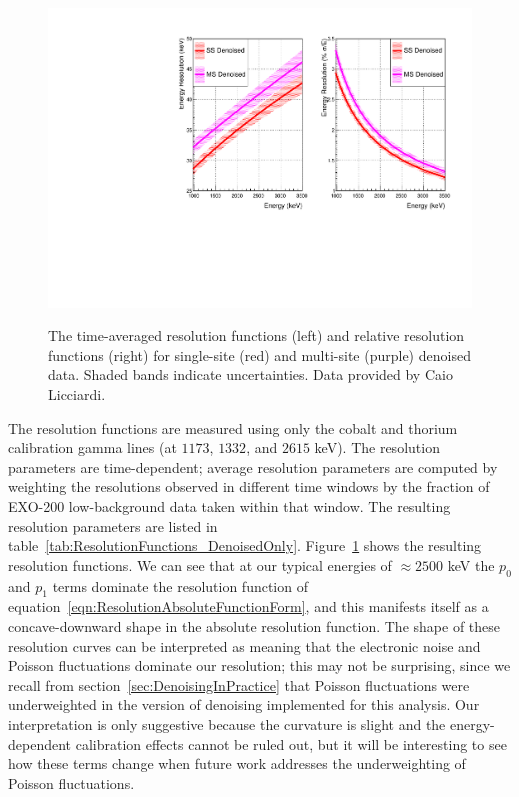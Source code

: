 \begin{figure}
\begin{center}
\includegraphics[keepaspectratio=true,width=\textwidth]{ResolutionDenoisedOnly.pdf}
\end{center}
\renewcommand{\baselinestretch}{1}
\small\normalsize
\begin{quote}
\caption{The time-averaged resolution functions (left) and relative resolution functions (right) for single-site (red) and multi-site (purple) denoised data.  Shaded bands indicate uncertainties.  Data provided by Caio Licciardi.}
\label{fig:ResolutionFunctionComparison_DenoisedOnly}
\end{quote}
\end{figure}
\renewcommand{\baselinestretch}{2}
\small\normalsize

The resolution functions are measured using only the cobalt and thorium calibration gamma lines (at $1173$, $1332$, and $2615$ keV).  The resolution parameters are time-dependent; average resolution parameters are computed by weighting the resolutions observed in different time windows by the fraction of EXO-200 low-background data taken within that window.  The resulting resolution parameters are listed in table~\ref{tab:ResolutionFunctions_DenoisedOnly}.  Figure~\ref{fig:ResolutionFunctionComparison_DenoisedOnly} shows the resulting resolution functions.  We can see that at our typical energies of $\approx 2500$ keV the $p_0$ and $p_1$ terms dominate the resolution function of equation~\ref{eqn:ResolutionAbsoluteFunctionForm}, and this manifests itself as a concave-downward shape in the absolute resolution function.  The shape of these resolution curves can be interpreted as meaning that the electronic noise and Poisson fluctuations dominate our resolution; this may not be surprising, since we recall from section~\ref{sec:DenoisingInPractice} that Poisson fluctuations were underweighted in the version of denoising implemented for this analysis.  Our interpretation is only suggestive because the curvature is slight and the energy-dependent calibration effects cannot be ruled out, but it will be interesting to see how these terms change when future work addresses the underweighting of Poisson fluctuations.

